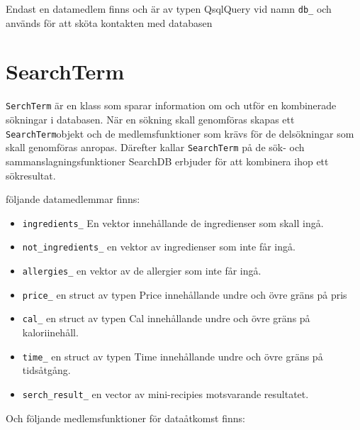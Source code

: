 Endast en datamedlem finns och är av typen QsqlQuery vid namn \verb+db_+ och
används för att sköta kontakten med databasen


\section{SearchTerm}

\verb+SerchTerm+ är en klass som sparar information om och utför en kombinerade sökningar i
databasen. När en sökning skall genomföras skapas ett \verb+SearchTerm+objekt
och de medlemsfunktioner som krävs för de delsökningar som skall genomföras anropas. Därefter
kallar \verb+SearchTerm+ på de sök- och sammanslagningsfunktioner SearchDB
erbjuder för att kombinera ihop ett sökresultat. 

följande datamedlemmar finns:

\begin{itemize}
\item \verb+ingredients_+ En vektor innehållande de ingredienser som skall ingå.

\item \verb+not_ingredients_+ en vektor av ingredienser som inte får ingå.

\item \verb+allergies_+ en vektor av de allergier som inte får ingå.

\item \verb+price_+ en struct av typen Price innehållande undre och övre gräns på pris

\item \verb+cal_+ en struct av typen Cal innehållande undre och övre gräns på kaloriinehåll.

\item \verb+time_+ en struct av typen Time innehållande undre och övre gräns på tidsåtgång.

\item \verb+serch_result_+ en vector av mini-recipies motsvarande resultatet.

\end{itemize}

Och följande medlemsfunktioner för dataåtkomst finns:

